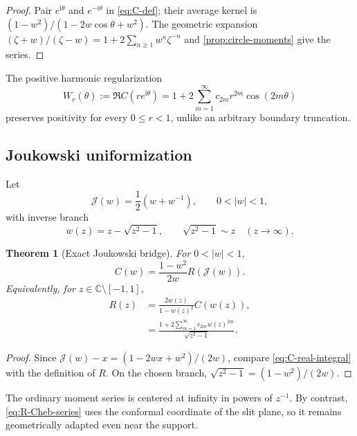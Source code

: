 \documentclass[11pt,oneside]{article}
\newtheorem{theorem}{Theorem}[section]
\theoremstyle{definition}
\newcommand{\ii}{\mathrm i}
\newcommand{\Jouk}{\mathcal J}
\begin{document}
\begin{proof}
Pair \(e^{\ii\theta}\) and \(e^{-\ii\theta}\) in \eqref{eq:C-def}; their average kernel is
\((1-w^2)/(1-2w\cos\theta+w^2)\). The geometric expansion
\((\zeta+w)/(\zeta-w)=1+2\sum_{n\ge1}w^n\zeta^{-n}\) and
\cref{prop:circle-moments} give the series.
\end{proof}

The positive harmonic regularization
\begin{equation}
 W_r(\theta):=\Re C(re^{\ii\theta})
 =1+2\sum_{m=1}^{\infty}c_{2m}r^{2m}\cos(2m\theta)
 \label{eq:Wr}
\end{equation}
preserves positivity for every \(0\le r<1\), unlike an arbitrary boundary truncation.

\subsection{Joukowski uniformization}

Let
\begin{equation}
 \Jouk(w)=\frac12(w+w^{-1}),\qquad 0<|w|<1,
 \label{eq:Joukowski}
\end{equation}
with inverse branch
\begin{equation}
 w(z)=z-\sqrt{z^2-1},
 \qquad \sqrt{z^2-1}\sim z\quad(z\to\infty).
 \label{eq:Joukowski-inverse}
\end{equation}

\begin{theorem}[Exact Joukowski bridge]
\label{thm:Joukowski-bridge}
For \(0<|w|<1\),
\begin{equation}
 C(w)=\frac{1-w^2}{2w}R(\Jouk(w)).
 \label{eq:C-R-Jouk}
\end{equation}
Equivalently, for \(z\in\mathbb C\setminus[-1,1]\),
\begin{align}
 R(z)&=\frac{2w(z)}{1-w(z)^2}C(w(z)),
 \label{eq:R-C-w}\\
 &=\frac{1+2\sum_{m=1}^{\infty}c_{2m}w(z)^{2m}}
 {\sqrt{z^2-1}}.
 \label{eq:R-Cheb-series}
\end{align}
\end{theorem}

\begin{proof}
Since \(\Jouk(w)-x=(1-2wx+w^2)/(2w)\), compare \eqref{eq:C-real-integral} with the
definition of \(R\). On the chosen branch, \(\sqrt{z^2-1}=(1-w^2)/(2w)\).
\end{proof}

The ordinary moment series is centered at infinity in powers of \(z^{-1}\). By contrast,
\eqref{eq:R-Cheb-series} uses the conformal coordinate of the slit plane, so it remains
geometrically adapted even near the support.
\end{document}
